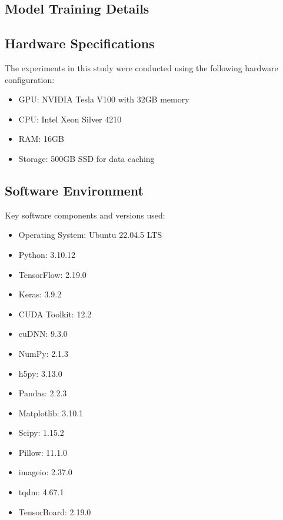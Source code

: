 \begin{theappendices}

  \chapter{Model Training Details}

  \section{Hardware Specifications}
  The experiments in this study were conducted using the following hardware configuration:
  \begin{itemize}
    \item GPU: NVIDIA Tesla V100 with 32GB memory
    \item CPU: Intel Xeon Silver 4210
    \item RAM: 16GB
    \item Storage: 500GB SSD for data caching
  \end{itemize}

  \section{Software Environment}
  Key software components and versions used:
  \begin{itemize}
    \item Operating System: Ubuntu 22.04.5 LTS
    \item Python: 3.10.12
    \item TensorFlow: 2.19.0
    \item Keras: 3.9.2
    \item CUDA Toolkit: 12.2
    \item cuDNN: 9.3.0
    \item NumPy: 2.1.3
    \item h5py: 3.13.0
    \item Pandas: 2.2.3
    \item Matplotlib: 3.10.1
    \item Scipy: 1.15.2
    \item Pillow: 11.1.0
    \item imageio: 2.37.0
    \item tqdm: 4.67.1
    \item TensorBoard: 2.19.0
  \end{itemize}


\end{theappendices}
